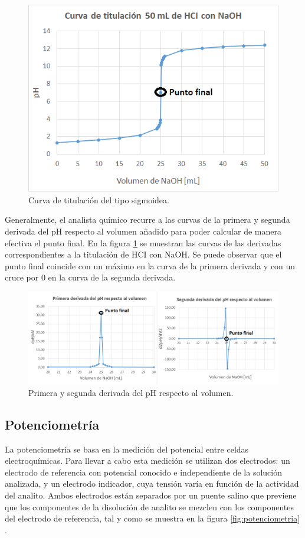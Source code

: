 \begin{figure}[htbp]
	\centering
	\includegraphics[width=.7\textwidth]{./Figures/curvaTitulacion1.png}
	\caption{Curva de titulación del tipo sigmoidea.}
	\label{fig:sigmoidea}
\end{figure}

Generalmente, el analista químico recurre a las curvas de la primera y segunda derivada del pH respecto al volumen añadido para poder calcular de manera efectiva el punto final. En la figura \ref{fig:sigmoidea} se muestran las curvas de las derivadas correspondientes a la titulación de HCI con NaOH. Se puede observar que el punto final coincide con un máximo en la curva de la primera derivada y con un cruce por 0 en la curva de la segunda derivada.

\begin{figure}[htbp]
	\centering
	\includegraphics[width=1.0\textwidth]{./Figures/derivada.png}
	\caption{Primera y segunda derivada del pH respecto al volumen.}
	\label{fig:derivada}
\end{figure}

\subsection{Potenciometría}

La potenciometría se basa en la medición del potencial entre celdas electroquímicas. Para llevar a cabo esta medición se utilizan dos electrodos: un electrodo de referencia con potencial conocido e independiente de la solución analizada, y un electrodo indicador, cuya tensión varía en función de la actividad del analito. Ambos electrodos están separados por un puente salino que previene que los componentes de la disolución de analito se mezclen con los componentes del electrodo de referencia, tal y como se muestra en la figura \ref{fig:potenciometria} \citep{BOOK:1}.

